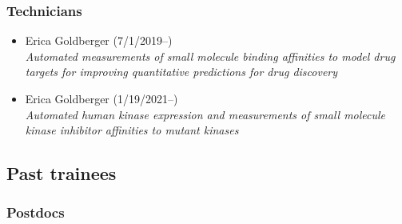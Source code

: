 \documentclass[10pt]{article}
\begin{document}
\subsubsection*{Technicians}

\begin{itemize}
  \item Erica Goldberger (7/1/2019--)\\
  \emph{Automated measurements of small molecule binding affinities to model drug targets for improving quantitative predictions for drug discovery}

  \item Erica Goldberger (1/19/2021--)\\
  \emph{Automated human kinase expression and measurements of small molecule kinase inhibitor affinities to mutant kinases}

\end{itemize}

\eject

\subsection*{Past trainees}

\subsubsection*{Postdocs}
\end{document}
